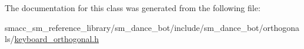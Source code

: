 The documentation for this class was generated from the following file\+:\begin{DoxyCompactItemize}
\item 
smacc\+\_\+sm\+\_\+reference\+\_\+library/sm\+\_\+dance\+\_\+bot/include/sm\+\_\+dance\+\_\+bot/orthogonals/\hyperlink{keyboard__orthogonal_8h}{keyboard\+\_\+orthogonal.\+h}\end{DoxyCompactItemize}
